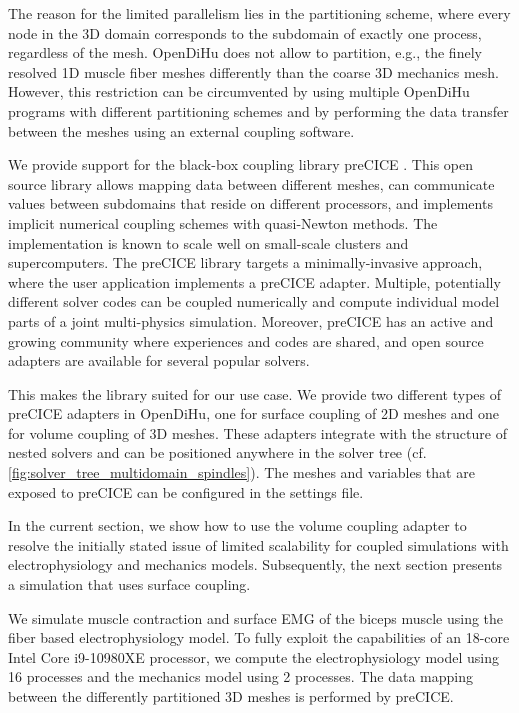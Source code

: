 The reason for the limited parallelism lies in the partitioning scheme, where every node in the 3D domain corresponds to the subdomain of exactly one process, regardless of the mesh. OpenDiHu does not allow to partition, e.g., the finely resolved 1D muscle fiber meshes differently than the coarse 3D mechanics mesh. However, this restriction can be circumvented by using multiple OpenDiHu programs with different partitioning schemes and by performing the data transfer between the meshes using an external coupling software.

We provide support for the black-box coupling library preCICE \cite{precice}. This open source library allows mapping data between different meshes, can communicate values between subdomains that reside on different processors, and implements implicit numerical coupling schemes with quasi-Newton methods. The implementation is known to scale well on small-scale clusters and supercomputers.
The preCICE library targets a minimally-invasive approach, where the user application implements a preCICE adapter. Multiple, potentially different solver codes can be coupled numerically and compute individual model parts of a joint multi-physics simulation. Moreover, preCICE has an active and growing community where experiences and codes are shared, and open source adapters are available for several popular solvers.

This makes the library suited for our use case. We provide two different types of preCICE adapters in OpenDiHu, one for surface coupling of 2D meshes and one for volume coupling of 3D meshes. These adapters integrate with the structure of nested solvers and can be positioned anywhere in the solver tree (cf. \cref{fig:solver_tree_multidomain_spindles}). The meshes and variables that are exposed to preCICE can be configured in the settings file.

In the current section, we show how to use the volume coupling adapter to resolve the initially stated issue of limited scalability for coupled simulations with electrophysiology and mechanics models. Subsequently, the next section presents a simulation that uses surface coupling.

We simulate muscle contraction and surface EMG of the biceps muscle using the fiber based electrophysiology model. To fully exploit the  capabilities of an 18-core Intel Core i9-10980XE processor, we compute the electrophysiology model using 16 processes and the mechanics model using 2 processes. The data mapping between the differently partitioned 3D meshes is performed by preCICE.

